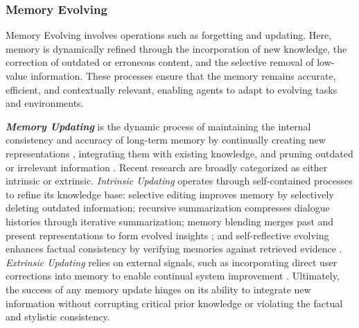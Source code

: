 \documentclass[manuscript,screen]{acmart}
\begin{document}
\subsubsection{Memory Evolving}
Memory Evolving involves operations such as forgetting and updating. Here, memory is dynamically refined through the incorporation of new knowledge, the correction of outdated or erroneous content, and the selective removal of low-value information. These processes ensure that the memory remains accurate, efficient, and contextually relevant, enabling agents to adapt to evolving tasks and environments.

\textit{\textbf{Memory Updating}} is the dynamic process of maintaining the internal consistency and accuracy of long-term memory by continually creating new representations \citep{chen2024compress}, integrating them with existing knowledge, and pruning outdated or irrelevant information \citep{bae2022keep}. Recent research are broadly categorized as either intrinsic or extrinsic. \textit{Intrinsic Updating} operates through self-contained processes to refine its knowledge base: selective editing \citep{bae2022keep} improves memory by selectively deleting outdated information; recursive summarization \citep{wang2025recursively} compresses dialogue histories through iterative summarization; memory blending merges past and present representations to form evolved insights \citep{kim2024ever}; and self-reflective evolving enhances factual consistency by verifying memories against retrieved evidence \citep{sun-etal-2024-towards-verifiable}. \textit{Extrinsic Updating} relies on external signals, such as incorporating direct user corrections into memory to enable continual system improvement \citep{dalvi-mishra-etal-2022-towards}. Ultimately, the success of any memory update hinges on its ability to integrate new information without corrupting critical prior knowledge or violating the factual and stylistic consistency.
\end{document}
